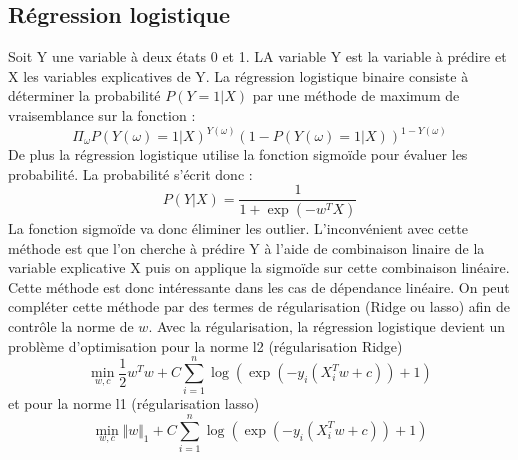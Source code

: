 \documentclass[12pt]{scrartcl} %
\begin{document}
\subsection{Régression logistique}
Soit Y une variable à deux états 0 et 1. LA variable Y est la variable à prédire et X les variables explicatives de Y. La régression logistique binaire consiste à déterminer la probabilité $P(Y=1|X)$ par une méthode de maximum de vraisemblance sur la fonction : 
$$
\Pi_{\omega}P\left(Y(\omega)=1|X\right)^{Y\left(\omega\right)}\left(1-P\left(Y\left(\omega\right)=1|X\right)\right)^{1-Y(\omega)}
$$
De plus la régression logistique utilise la fonction sigmoïde pour évaluer les probabilité. La probabilité s'écrit donc : 
$$
P(Y|X)=\frac{1}{1+\exp(-w^TX)}
$$
La fonction sigmoïde va donc éliminer les outlier. L'inconvénient avec cette méthode est que l'on cherche à prédire Y à l'aide de combinaison linaire de la variable explicative X puis on applique la sigmoïde sur cette combinaison linéaire. Cette méthode est donc intéressante dans les cas de dépendance linéaire. On peut compléter cette méthode par des termes de régularisation (Ridge ou lasso) afin de contrôle la norme de $w$. Avec la régularisation, la régression logistique devient un problème d'optimisation pour la norme l2 (régularisation Ridge)
$$
\min_{w,c}\frac{1}{2}w^Tw+C\sum_{i=1}^n\log(\exp(-y_i(X_i^Tw+c))+1)
$$
et pour la norme l1 (régularisation lasso)
$$
\min_{w,c}\Vert w\Vert_1+C\sum_{i=1}^n\log(\exp(-y_i(X_i^Tw+c))+1)
$$
\end{document}
